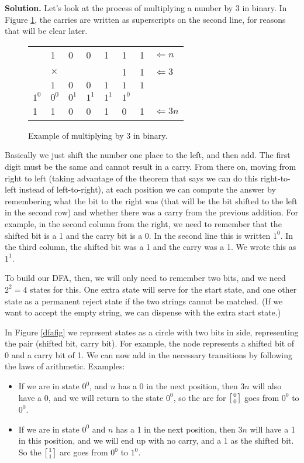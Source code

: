 \documentclass{article}
\newcommand{\duple}[2]{\left[{#1}\atop{#2}\right]}
\begin{document}
\begin{enumerate}
  {\bf Solution.}
  Let's look at the process of multiplying a number by 3 in binary.
  In Figure \ref{multfig}, the carries are written as superscripts on the
  second line, for reasons that will be clear later.

  \begin{figure}[!htbp]
    \begin{center}
  \begin{tabular}{llllllll}
    &    1 & 0 & 0 & 1 & 1 & 1 & $\Leftarrow n$\\
    &    $\times$ &&&&1&1 & $\Leftarrow 3$\\\hline
    &    $1$ & $0$ & $0$ & $1$ & $1$ & $1$\\
     $1^0$ & $0^0$ & $0^1$ & $1^1$ & $1^1$ & $1^0$&\\\hline
     1& 1& 0& 0 &1 &0 &1 & $\Leftarrow 3n$\\
  \end{tabular}
  \end{center}
  \caption{Example of multiplying by 3 in binary.}
  \label{multfig}
  \end{figure}

  Basically we just shift the number one place to the left, and then
  add.  The first digit must be the same and cannot result in a carry.
  From there on, moving from right to left (taking advantage of the
  theorem that says we can do this right-to-left instead of
  left-to-right), at each position we can compute the answer by
  remembering what the bit to the right was (that will be the bit
  shifted to the left in the second row) and whether there was a carry
  from the previous addition.  For example, in the second column from
  the right, we need to remember that the shifted bit is a 1 and the
  carry bit is a 0.  In the second line this is written $1^0$.  In the
  third column, the shifted bit was a 1 and the carry was a 1.  We
  wrote this as $1^1$.

  To build our DFA, then, we will only need to remember two bits, and
  we need $2^2=4$ states for this.  One extra state will serve for the
  start state, and one other state as a permanent reject state if the
  two strings cannot be matched. (If we want to accept the empty
  string, we can dispense with the extra start state.)

  In Figure \ref{dfafig} we represent states as a circle with two bits
  in side, representing the pair (shifted bit, carry bit).  For
  example, the node  represents a
  shifted bit of 0 and a carry bit of 1.  We can now add in the
  necessary transitions by following the laws of arithmetic.
Examples:
  \begin{itemize}
  \item     If we are in state $0^0$, and $n$ has a 0 in the next
  position, then $3n$ will also have a 0, and we will return to the
  state $0^0$, so the arc for $\duple 00$ goes from $0^0$ to $0^0$.
\item If we are in state $0^0$ and $n$ has a 1 in the next position,
  then $3n$ will have a 1 in this position, and we will end up
  with no carry, and a 1 as the shifted bit.   So the $\duple 11$ arc
  goes from $0^0$ to $1^0$.
  \end{itemize}


\end{enumerate}
\end{document}
